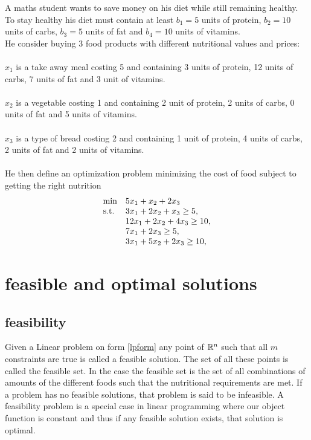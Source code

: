 \begin{example}\label{lpex}
A maths student wants to save money on his diet while still remaining healthy. To stay healthy his diet must contain at least $b_1=5$ units of protein, $b_2=10$ units of carbs, $b_3=5$ units of fat and $b_4=10$ units of vitamins.\\
He consider buying 3 food products with different nutritional values and prices: \\\\$x_1$ is a take away meal costing 5 and containing 3 units of protein, 12 units of carbs, 7 units of fat and 3 unit of vitamins.\\\\
$x_2$ is a vegetable costing 1 and containing 2 unit of protein, 2 units of carbs, 0 units of fat and 5 units of vitamins.\\\\
$x_3$ is a type of bread costing 2 and containing 1 unit of protein, 4 units of carbs, 2 units of fat and 2 units of vitamins.\\\\
He then define an optimization problem minimizing the cost of food subject to getting the right nutrition
\begin{align}
\begin{array}{ll@{}ll}
\text{min} &5x_1+x_2+2x_3&\\
\text{s.t.} &3x_1+2x_2+x_3 \geq 5,&\\
&12x_1+2x_2+4x_3 \geq 10,&\\
&7x_1+2x_3 \geq 5,&\\
&3x_1+5x_2+2x_3 \geq 10,&\\
\end{array}
\end{align}
\end{example}
\section{feasible and optimal solutions}
\subsection{feasibility}
Given a Linear problem on form \ref{lpform} any point of $\mathbb{R}^n$ such that all $m$ constraints are true is called a feasible solution. The set of all these points is called the feasible set. In the case  the feasible set is the set of all combinations of amounts of the different foods such that the nutritional requirements are met. If a problem has no feasible solutions, that problem is said to be infeasible. A feasibility problem is a special case in linear programming where our object function is constant and thus if any feasible solution exists, that solution is optimal.
